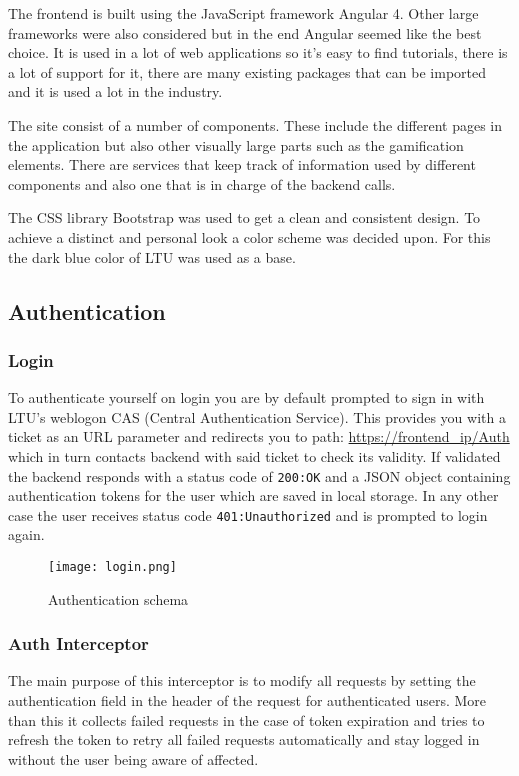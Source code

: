 The frontend is built using the JavaScript framework Angular 4. Other large frameworks were also considered but in the end Angular seemed like the best choice. It is used in a lot of web applications so it's easy to find tutorials, there is a lot of support for it, there are many existing packages that can be imported and it is used a lot in the industry.

The site consist of a number of components. These include the different pages in the application but also other visually large parts such as the gamification elements. There are services that keep track of information used by different components and also one that is in charge of the backend calls.

The CSS library Bootstrap was used to get a clean and consistent design. To achieve a distinct and personal look a color scheme was decided upon. For this the dark blue color of LTU was used as a base.

\subsection{Authentication}
\subsubsection{Login}
To authenticate yourself on login you are by default prompted to sign in with LTU's weblogon CAS (Central Authentication Service). 
This provides you with a ticket as an URL parameter and redirects you to path: \url{https://frontend\_ip/Auth} which in turn contacts backend with said ticket to check its validity. If validated the backend responds with a status code of \texttt{200:\@ OK} and a JSON object containing authentication tokens for the user which are saved in local storage. In any other case the user receives status code \texttt{401:\@ Unauthorized} and is prompted to login again.
\begin{figure}[hb]
    \centering
    \texttt{[image: login.png]}
    \caption{Authentication schema}
    \label{fig:auth}
\end{figure}

\subsubsection{Auth Interceptor}
The main purpose of this interceptor is to modify all requests by setting the authentication field in the header of the request for authenticated users. More than this it collects failed requests in the case of token expiration and tries to refresh the token to retry all failed requests automatically and stay logged in without the user being aware of affected.

